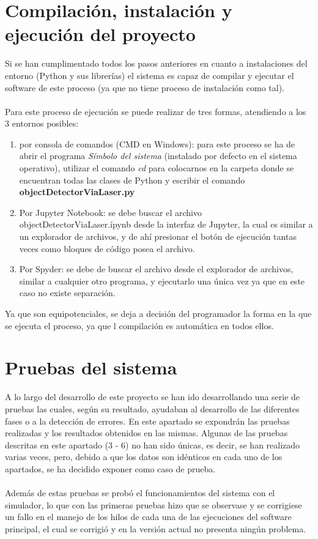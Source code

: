 \section{Compilación, instalación y ejecución del proyecto}
Si se han cumplimentado todos los pasos anteriores en cuanto a instalaciones del entorno (Python y sus librerías) el sistema es capaz de compilar y ejecutar el software de este proceso (ya que no tiene proceso de instalación como tal).\\
\\
Para este proceso de ejecución se puede realizar de tres formas, atendiendo a los 3 entornos posibles:
\begin{enumerate}
	\item por consola de comandos (CMD en Windows): para este proceso se ha de abrir el programa \textit{Símbolo del sistema} (instalado por defecto en el sistema operativo), utilizar el comando \textit{cd} para colocarnos en la carpeta donde se encuentran todas las clases de Python y escribir el comando \textbf{objectDetectorViaLaser.py}
	\item Por Jupyter Notebook: se debe buscar el archivo objectDetectorViaLaser.ípynb desde la interfaz de Jupyter, la cual es similar a un explorador de archivos, y de ahí presionar el botón de ejecución tantas veces como bloques de código posea el archivo.
	\item Por Spyder: se debe de buscar el archivo desde el explorador de archivos, similar a cualquier otro programa, y ejecutarlo una única vez ya que en este caso no existe separación. 
\end{enumerate}
Ya que son equipotenciales, se deja a decisión del programador la forma en la que se ejecuta el proceso, ya que l compilación es automática en todos ellos.


\section{Pruebas del sistema}
A lo largo del desarrollo de este proyecto se han ido desarrollando una serie de pruebas las cuales, según su resultado, ayudaban al desarrollo de las diferentes fases o a la detección de errores. En este apartado se expondrán las pruebas realizadas y los resultados obtenidos en las mismas. Algunas de las pruebas descritas en este apartado (3 - 6) no han sido únicas, es decir, se han realizado varias veces, pero, debido a que los datos son idénticos en cada uno de los apartados, se ha decidido exponer como caso de prueba.\\
\\
Además de estas pruebas se probó el funcionamientos del sistema con el simulador, lo que con las primeras pruebas hizo que se observase y se corrigiese un fallo en el manejo de los hilos de cada una de las ejecuciones del software principal, el cual se corrigió y en la versión actual no presenta ningún problema.
